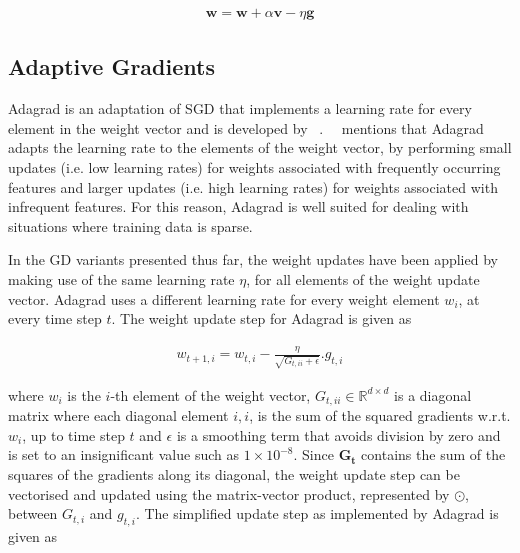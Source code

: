 \begin{equation}
      \label{eq:heuristics:gd:nag_part_2}
      \begin{split}
            \boldsymbol{w} = \boldsymbol{w} + \alpha \boldsymbol{v} - \eta \boldsymbol{g}
      \end{split}
\end{equation}


\subsection{Adaptive Gradients}\label{sec:heuristics:adagrad}

\Acf{Adagrad} is an adaptation of \acs{SGD} that implements a learning rate for every element in the weight vector and is developed by \citeauthor{ref:duchi:2011}~\cite{ref:duchi:2011}.~\citeauthor{ref:ruder:2016}~\cite{ref:ruder:2016} mentions that \acs{Adagrad} adapts the learning rate to the elements of the weight vector, by  performing small updates (i.e. low learning rates) for weights associated with frequently occurring features and larger updates (i.e. high learning rates) for weights associated with infrequent features. For this reason, \acs{Adagrad} is well suited for dealing with situations where training data is sparse.

In the \acs{GD} variants presented thus far, the weight updates have been applied by making use of the same learning rate $\eta$, for all elements of the weight update vector. \Acs{Adagrad} uses a different learning rate for every weight element $w_{i}$, at every time step $t$. The weight update step for \acs{Adagrad} is given as

\begin{equation}
      \label{eq:heuristics:gd:adagrad_part_1}
      \begin{split}
            w_{t+1,i} = w_{t,i} - \frac{\eta}{\sqrt{G_{t,ii} + \epsilon}}.g_{t,i}
      \end{split}
\end{equation}

where $w_{i}$ is the $i$-th element of the weight vector, $G_{t,ii} \in \mathbb{R}^{d \times d}$ is a diagonal matrix where each diagonal element $i,i$, is the sum of the squared gradients w.r.t. $w_{i}$, up to time step $t$ and $\epsilon$ is a smoothing term that avoids division by zero and is set to an insignificant value such as $1 \times 10^{-8}$. Since $\boldsymbol{G_{t}}$ contains the sum of the squares of the gradients along its diagonal, the weight update step can be vectorised and updated using the matrix-vector product, represented by $\odot$, between $G_{t,i}$ and $g_{t,i}$. The simplified update step as implemented by \acs{Adagrad} is given as

